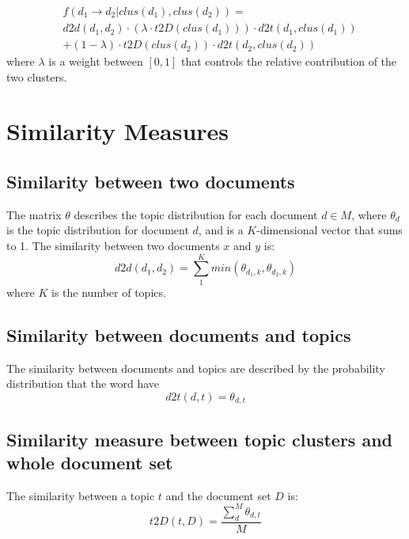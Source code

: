 \begin{align*}
&f(d_1 \rightarrow d_2 | clus(d_1), clus(d_2)) = \\
&d2d(d_1, d_2) \cdot (\lambda \cdot t2D(clus(d_1))) \cdot d2t(d_1, clus(d_1)) \\ 
&+ (1-\lambda) \cdot t2D(clus(d_2)) \cdot d2t(d_2, clus(d_2))
\end{align*}
where $\lambda$ is a weight between $[0,1]$ that controls the relative contribution of the two clusters.


\section{Similarity Measures}\label{sec:similarity}
\subsection{Similarity between two documents}
The matrix $\theta$ describes the topic distribution for each document $d \in M$, where $\theta_d$ is the topic distribution for document $d$, and is a $K$-dimensional vector that sums to 1.
The similarity between two documents $x$ and $y$ is:
$$ d2d(d_1, d_2) = \sum_{1}^{K} min(\theta_{d_1,k}, \theta_{d_2,k})$$
where $K$ is the number of topics.

\subsection{Similarity between documents and topics}
The similarity between documents and topics are described by the probability distribution that the word have
$$ d2t(d,t) = \theta_{d,t}$$

\subsection{Similarity measure between topic clusters and whole document set}
The similarity between a topic $t$ and the document set $D$ is:
$$ t2D(t, D) = \frac{\sum_{d}^{M} \theta_{d,t}}{M} $$